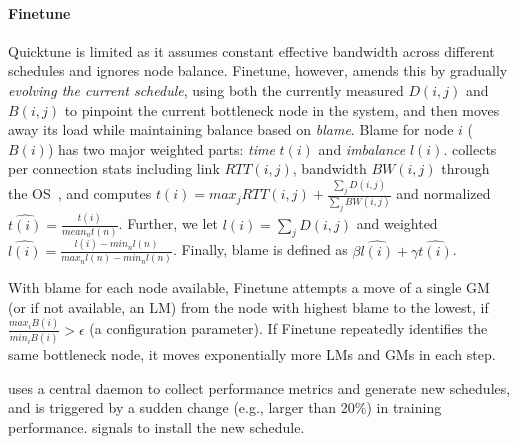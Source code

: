 \paragraph{Finetune}
Quicktune is limited as it assumes constant effective bandwidth across different schedules and ignores node balance. Finetune, however, amends this by gradually \textit{evolving the current schedule}, using both the currently measured $D(i,j)$ and $B(i,j)$ to pinpoint the current bottleneck node in the system, and then moves away its load while maintaining balance based on \textit{blame}. Blame for node $i$ ($B(i)$) has two major weighted parts: \textit{time} $t(i)$ and \textit{imbalance} $l(i)$. \autoplink collects per connection stats including link $RTT(i,j)$, bandwidth $BW(i,j)$ through the OS~\cite{NetlinkW13:online, mathis2003web100}, and computes $t(i)=max_{j}RTT(i,j) + \frac{\sum_{j}D(i,j)}{\sum_jBW(i,j)}$ and normalized $\hat{t(i)} = \frac{t(i)}{mean_n t(n)}$. %
Further, we let $l(i) = \sum_j{D(i,j)}$ and weighted $\hat{l(i)} = \frac{l(i) -  min_nl(n)}{max_nl(n) - min_nl(n)}$. Finally, blame is defined as $\beta \hat{l(i)} + \gamma \hat{t(i)}$.%

With blame for each node available, Finetune attempts a move of a single GM (or if not available, an LM) from the node with highest blame to the lowest, if $\frac{max_iB(i)}{min_iB(i)} >\epsilon$ (a configuration parameter). If Finetune repeatedly identifies the same bottleneck node, it moves exponentially more LMs and GMs in each step. %



\autoplink uses a central daemon to collect performance metrics and generate new schedules, and is triggered by a sudden change (e.g., larger than 20\%) in training performance. \autoplink signals \ha to install the new schedule. %

